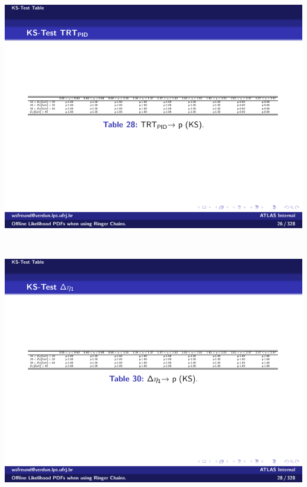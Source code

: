 \begin{table}[p]
\begin{subtable}{\textwidth}
\caption{\TRTPID{}\label{tab:gof_ks_p_values_trt}}
\includegraphics[width=\textwidth]{appendices/figures/gof/TRT_PID_ks_table.pdf}
\end{subtable} \\
\begin{subtable}{\textwidth}
\caption{\deltaeta{}\label{tab:gof_ks_p_values_eta}}
\includegraphics[width=\textwidth]{appendices/figures/gof/deltaeta_ks_table.pdf}
\end{subtable} \\
\begin{subtable}{\textwidth}
\caption{\deltaphires{}\label{tab:gof_ks_p_values_deltaphi}}

\end{subtable}
\end{table}
